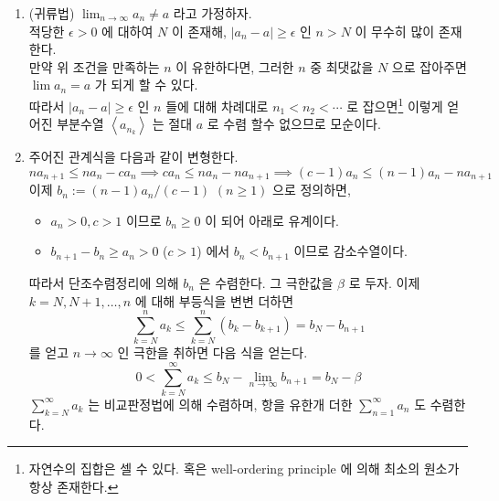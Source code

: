 \documentclass[12pt]{report}
\newcommand{\numl}[1]{\item[\large\textbf{\sffamily #1.}]}
\renewcommand{\span}[1]{\left\langle #1 \right\rangle}
\newcommand{\ra}{\rightarrow}
\newcommand{\abs}[1]{\left|#1\right|}
\newcommand{\ds}{\displaystyle}
\newcommand{\imp}{\implies}
\begin{document}
\begin{enumerate}
\numl{6} (귀류법) $\ds \lim_{n\ra\infty} a_n \neq a$ 라고 가정하자.\\
적당한 $\epsilon > 0$ 에 대하여 $N$ 이 존재해, $\abs{a_n - a} \geq \epsilon$ 인 $n>N$ 이 무수히 많이 존재한다.\\
만약 위 조건을 만족하는 $n$ 이 유한하다면, 그러한 $n$ 중 최댓값을 $N$ 으로 잡아주면 $\lim a_n = a$ 가 되게 할 수 있다.\\
따라서 $\abs{a_n-a} \geq \epsilon$ 인 $n$ 들에 대해 차례대로 $n_1 < n_2 < \cdots$ 로 잡으면\footnote{자연수의 집합은 셀 수 있다. 혹은 well-ordering principle 에 의해 최소의 원소가 항상 존재한다.} 이렇게 얻어진 부분수열 $\span{a_{n_k}}$ 는 절대 $a$ 로 수렴 할수 없으므로 모순이다. 

\numl{8} 주어진 관계식을 다음과 같이 변형한다. $$na_{n+1} \leq na_n-ca_n \imp ca_n \leq na_n - na_{n+1} \imp (c-1)a_n\leq (n-1)a_n-na_{n+1}$$
이제 $b_n := (n-1)a_n / (c - 1)$ $(n\geq 1)$ 으로 정의하면,
\begin{itemize}
	\item $a_n>0, c > 1$ 이므로 $b_n \geq0$ 이 되어 아래로 유계이다.
	\item $b_{n+1} - b_n \geq a_n > 0$ ($c>1$) 에서 $b_n < b_{n+1}$ 이므로 감소수열이다.
\end{itemize}
따라서 단조수렴정리에 의해 $b_n$ 은 수렴한다. 그 극한값을 $\beta$ 로 두자. 이제 $k = N, N+1, \dots, n$ 에 대해 부등식을 변변 더하면
$$\sum_{k=N}^n a_k \leq \sum_{k=N}^n(b_k - b_{k+1}) = b_N-b_{n+1}$$ 를 얻고 $n\ra \infty$ 인 극한을 취하면 다음 식을 얻는다.
$$0 < \sum_{k=N}^\infty a_k \leq b_N-\lim_{n\ra \infty} b_{n+1} = b_N-\beta $$
$\sum_{k=N}^\infty a_k$ 는 비교판정법에 의해 수렴하며, 항을 유한개 더한 $\sum_{n=1}^\infty a_n$ 도 수렴한다.

\end{enumerate}
\end{document}
